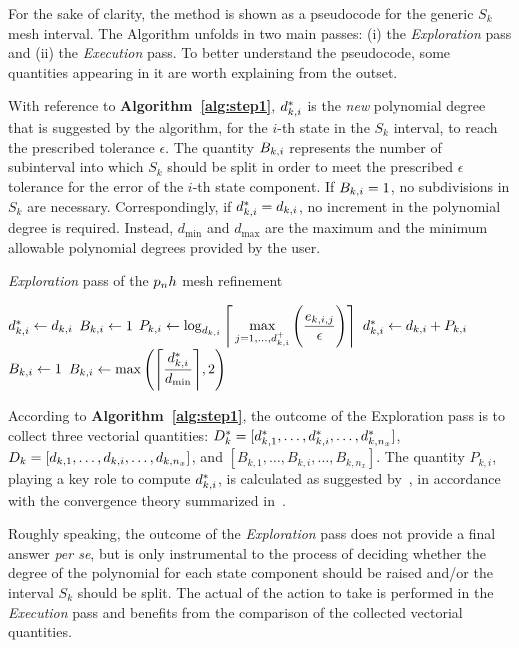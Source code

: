 For the sake of clarity, the method is shown as a pseudocode for the generic $S_k$ mesh interval. The Algorithm unfolds in two main passes: (i) the \emph{Exploration} pass and (ii) the \emph{Execution} pass.
To better understand the pseudocode, some quantities appearing in it are worth explaining from the outset.

With reference to {\bf Algorithm~\ref{alg:step1}}, $d_{k,i}^{*}$ is the \emph{new} polynomial degree that is suggested by the algorithm, for the $i$-th state in the $S_k$ interval, to reach the prescribed tolerance $\epsilon$. The quantity $B_{k,i}$ represents the number of subinterval into which $S_k$ should be split in order to meet the prescribed $\epsilon$ tolerance for the error of the $i$-th state component. If $B_{k,i} = 1$, no subdivisions in $S_k$ are necessary. Correspondingly, if $d_{k,i}^{*} = d_{k,i}$, no increment in the polynomial degree is required. Instead, $d_\text{min}$ and $d_\text{max}$ are the maximum and the minimum allowable polynomial degrees provided by the user.
\begin{algorithm}
\caption{\emph{Exploration} pass of the $p_{n}h$ mesh refinement}\label{alg:step1}
	\begin{algorithmic}[1]
				\State $d_{k,i}^{*} \gets d_{k,i}$ 
				\State $B_{k,i} \gets 1$     
			\Else
				\State $P_{k,i} \gets \log_{d_{k,i}} \Bigg\lceil \max\limits_{j= 1, \dots, d_{k,i}^{+}} \Bigg(\dfrac{e_{k,i,j}}{\epsilon}\Bigg) \Bigg\rceil$
				\State $d_{k,i}^{*} \gets d_{k,i} + P_{k,i}$ 
						\State $B_{k,i} \gets 1$		
					\Else
						\State $B_{k,i} \gets \max\Bigg(\Bigg\lceil \dfrac{d_{k,i}^{*}}{d_\text{min}}\Bigg\rceil, 2\Bigg)$ 
					\EndIf
			\EndIf
		\EndFor
	\end{algorithmic}
\end{algorithm}

According to {\bf Algorithm~\ref{alg:step1}}, the outcome of the Exploration pass is to collect three vectorial quantities: $D_{k}^{*} = [d_{k,1}^{*}, \dots, d_{k,i}^{*}, \dots, d_{k,n_x}^{*}]$, $D_{k} = [d_{k,1}, \dots, d_{k,i}, \dots, d_{k,n_x}]$, and $[B_{k,1}, \ldots, B_{k,i}, \ldots, B_{k,n_x}]$. The quantity $P_{k,i}$, playing a key role to compute $d_{k,i}^{*}$, is calculated as suggested by~\cite{Patterson:OCAM:2015}, in accordance with the convergence theory summarized in~\cite{Hou:GNC:2012,Hou:PHD:2013}.

Roughly speaking, the outcome of the \emph{Exploration} pass does not provide a final answer \emph{per se}, but is only instrumental to the process of deciding whether the degree of the polynomial for each state component should be raised and/or the interval $S_k$ should be split. The actual of the action to take is performed in the \emph{Execution} pass and benefits from the comparison of the collected vectorial quantities.


